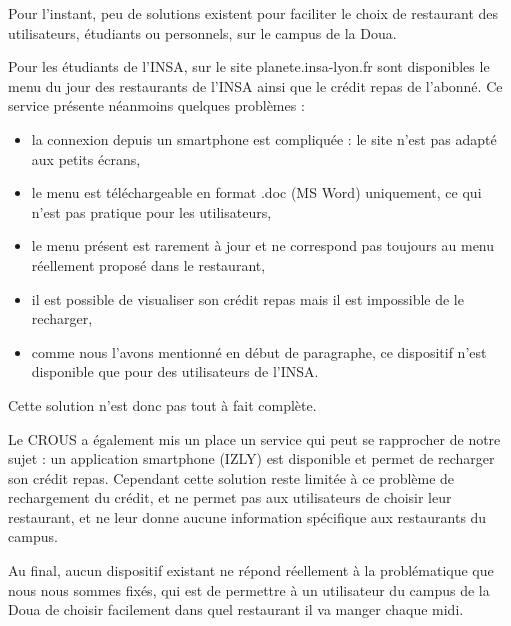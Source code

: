 Pour l’instant, peu de solutions existent pour faciliter le choix de
restaurant des
utilisateurs, étudiants ou personnels, sur le campus de la Doua. 

Pour les étudiants de l'INSA, sur le site planete.insa-lyon.fr sont disponibles 
le menu du jour des restaurants de l'INSA ainsi que le crédit repas de 
l'abonné. Ce service présente néanmoins quelques problèmes : 
\begin{itemize}
\item la connexion depuis un smartphone est compliquée : le site n'est pas 
adapté aux petits écrans,
\item le menu est téléchargeable en format .doc (MS Word) uniquement, ce qui 
n'est pas pratique pour les utilisateurs,
\item le menu présent est rarement à jour et ne correspond pas toujours au 
menu réellement proposé dans le restaurant,
\item il est possible de visualiser son crédit repas mais il est impossible 
de le recharger,
\item comme nous l'avons mentionné en début de  paragraphe, ce dispositif 
	n'est disponible que pour des utilisateurs de l'INSA.
\end{itemize}

Cette solution n'est donc pas tout à fait complète.

Le CROUS a également mis un place un service qui peut se rapprocher de notre 
sujet : un application smartphone (IZLY) est disponible et permet de 
recharger son crédit repas. Cependant cette solution reste limitée à ce 
problème de rechargement du crédit, et ne permet pas aux utilisateurs 
de choisir leur restaurant, et ne leur donne aucune information spécifique 
aux restaurants du campus.

Au final, aucun dispositif existant ne répond réellement à la problématique 
que nous nous sommes fixés, qui est de permettre à un utilisateur du
campus de la Doua de choisir facilement dans quel restaurant il va
manger chaque midi.
